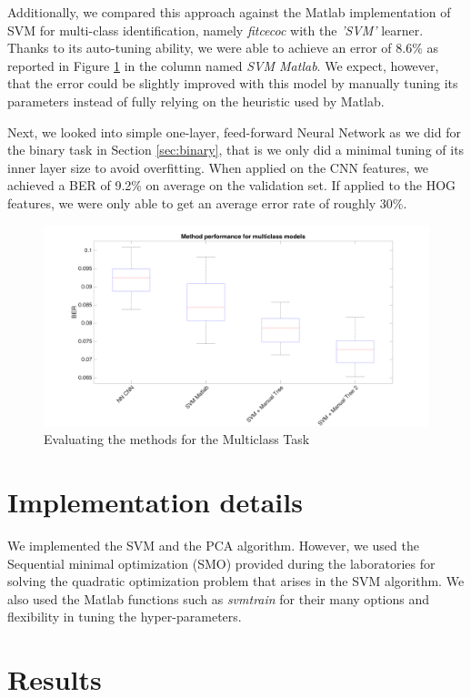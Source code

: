 \documentclass{article} %
\begin{document}
Additionally, we compared this approach against the Matlab implementation of SVM for multi-class identification, namely \textit{fitcecoc} with the \textit{'SVM'} learner. Thanks to its auto-tuning ability, we were able to achieve an error of 8.6\% as reported in Figure \ref{fig:methods-multiclass} in the column named \textit{SVM Matlab}. We expect, however, that the error could be slightly improved with this model by manually tuning its parameters instead of fully relying on the heuristic used by Matlab.

Next, we looked into simple one-layer, feed-forward Neural Network as we did for the binary task in Section \ref{sec:binary}, that is we only did a minimal tuning of its inner layer size to avoid overfitting. When applied on the CNN features, we achieved a BER of 9.2\% on average on the validation set. If applied to the HOG features, we were only able to get an average error rate of roughly 30\%.


\begin{figure}[h]
  \center
  \includegraphics[width=\textwidth]{figures/multiclass_methods}
  \caption{Evaluating the methods for the Multiclass Task}
  \label{fig:methods-multiclass}
\end{figure}


\section{Implementation details}
We implemented the SVM and the PCA algorithm. However, we used the Sequential minimal optimization (SMO) provided during the laboratories for solving the quadratic optimization problem that arises in the SVM algorithm. We also used the Matlab functions such as \textit{svmtrain} for their many options and flexibility in tuning the hyper-parameters.

\section{Results}
\end{document}
